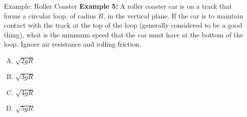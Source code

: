 \documentclass[12pt,compress,aspectratio=169]{beamer}
\begin{document}
%



\begin{frame}{Example: Roller Coaster}
  \textbf{Example 5:} A roller coaster car is on a track that forms a circular
  loop, of radius $R$, in the vertical plane. If the car is to maintain contact
  with the track at the top of the loop (generally considered to be a good
  thing), what is the minimum speed that the car must have at the bottom of the
  loop. Ignore air resistance and rolling friction.
  \begin{enumerate}[A.]
  \item $\sqrt{2gR}$
  \item $\sqrt{3gR}$
  \item $\sqrt{4gR}$
  \item $\sqrt{5gR}$
  \end{enumerate}
\end{frame}



\end{document}
